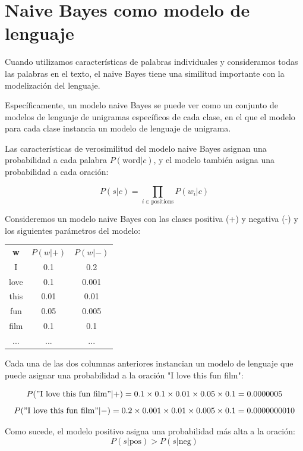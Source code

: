
\section{Naive Bayes como modelo de lenguaje}

Cuando utilizamos características de palabras individuales y consideramos todas las palabras en el texto, el naive Bayes tiene una similitud importante con la modelización del lenguaje.

Específicamente, un modelo naive Bayes se puede ver como un conjunto de modelos de lenguaje de unigramas específicos de cada clase, en el que el modelo para cada clase instancia un modelo de lenguaje de unigrama.

Las características de verosimilitud del modelo naive Bayes asignan una probabilidad a cada palabra $P(\text{word}|c)$, y el modelo también asigna una probabilidad a cada oración:

\[P(s|c) = \prod_{i\in \text{positions}} P(w_i|c)\]

Consideremos un modelo naive Bayes con las clases positiva (+) y negativa (-) y los siguientes parámetros del modelo:

\begin{center}
\begin{tabular}{ccc}
\textbf{w} & $P(w|+)$ & $P(w|-)$ \\
I & 0.1 & 0.2 \\
love & 0.1 & 0.001 \\
this & 0.01 & 0.01 \\
fun & 0.05 & 0.005 \\
film & 0.1 & 0.1 \\
... & ... & ...
\end{tabular}
\end{center}

Cada una de las dos columnas anteriores instancian un modelo de lenguaje que puede asignar una probabilidad a la oración "I love this fun film":

\[P("\text{I love this fun film}"|+) = 0.1 \times 0.1 \times 0.01 \times 0.05 \times 0.1 = 0.0000005\]
\[P("\text{I love this fun film}"|-) = 0.2 \times 0.001 \times 0.01 \times 0.005 \times 0.1 = 0.0000000010\]

Como sucede, el modelo positivo asigna una probabilidad más alta a la oración:
\[P(s|\text{pos}) > P(s|\text{neg})\]


